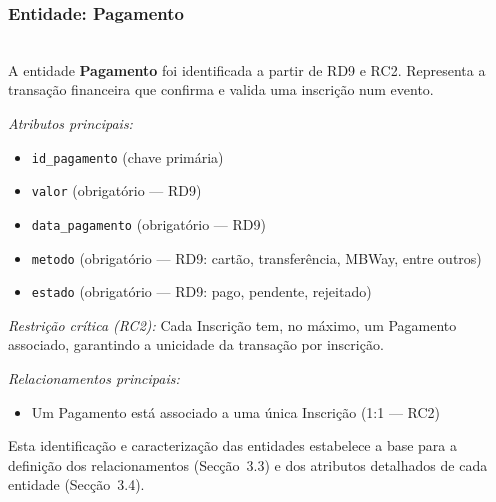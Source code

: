 \documentclass[runningheads]{llncs}
\begin{document}
                \vspace{0.4cm}
                \noindent\begin{minipage}{\textwidth}
                \subsubsection{Entidade: Pagamento}\mbox{}\\
                A entidade \textbf{Pagamento} foi identificada a partir de RD9 e RC2. Representa a
                transação financeira que confirma e valida uma inscrição num evento.

                \vspace{0.2cm}
                \noindent\textit{Atributos principais:}
                \begin{itemize}
                    \item \texttt{id\_pagamento} (chave primária)
                    \item \texttt{valor} (obrigatório --- RD9)
                    \item \texttt{data\_pagamento} (obrigatório --- RD9)
                    \item \texttt{metodo} (obrigatório --- RD9: cartão, transferência, MBWay, entre outros)
                    \item \texttt{estado} (obrigatório --- RD9: pago, pendente, rejeitado)
                \end{itemize}

                \vspace{0.2cm}
                \noindent\textit{Restrição crítica (RC2):} Cada Inscrição tem, no máximo, um Pagamento associado,
                garantindo a unicidade da transação por inscrição.

                \vspace{0.2cm}
                \noindent\textit{Relacionamentos principais:}
                \begin{itemize}
                    \item Um Pagamento está associado a uma única Inscrição (1:1 --- RC2)
                \end{itemize}
                \end{minipage}

                \vspace{0.4cm}
                Esta identificação e caracterização das entidades estabelece a base para a definição
                dos relacionamentos (Secção~3.3) e dos atributos detalhados de cada entidade (Secção~3.4).
\end{document}
